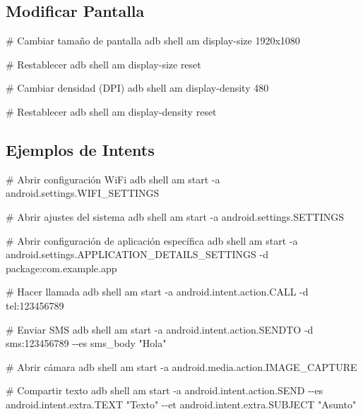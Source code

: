\documentclass[
  doc,
  floatsintext,
  longtable,
  a4paper,
  nolmodern,
  notxfonts,
  notimes,
  12pt,
  colorlinks=true,linkcolor=blue,citecolor=blue,urlcolor=blue]{apa7}
\newenvironment{Shaded}{\begin{snugshade}}{\end{snugshade}}
\newcommand{\AttributeTok}[1]{\textcolor[rgb]{0.40,0.45,0.13}{#1}}
\newcommand{\CommentTok}[1]{\textcolor[rgb]{0.37,0.37,0.37}{#1}}
\newcommand{\ExtensionTok}[1]{\textcolor[rgb]{0.00,0.23,0.31}{#1}}
\newcommand{\NormalTok}[1]{\textcolor[rgb]{0.00,0.23,0.31}{#1}}
\newcommand{\StringTok}[1]{\textcolor[rgb]{0.13,0.47,0.30}{#1}}
\begin{document}
\subsection{Modificar Pantalla}\label{modificar-pantalla}

\begin{Shaded}
\begin{Highlighting}[]
\CommentTok{\# Cambiar tamaño de pantalla}
\ExtensionTok{adb}\NormalTok{ shell am display{-}size 1920x1080}

\CommentTok{\# Restablecer}
\ExtensionTok{adb}\NormalTok{ shell am display{-}size reset}

\CommentTok{\# Cambiar densidad (DPI)}
\ExtensionTok{adb}\NormalTok{ shell am display{-}density 480}

\CommentTok{\# Restablecer}
\ExtensionTok{adb}\NormalTok{ shell am display{-}density reset}
\end{Highlighting}
\end{Shaded}

\subsection{Ejemplos de Intents}\label{ejemplos-de-intents}

\begin{Shaded}
\begin{Highlighting}[]
\CommentTok{\# Abrir configuración WiFi}
\ExtensionTok{adb}\NormalTok{ shell am start }\AttributeTok{{-}a}\NormalTok{ android.settings.WIFI\_SETTINGS}

\CommentTok{\# Abrir ajustes del sistema}
\ExtensionTok{adb}\NormalTok{ shell am start }\AttributeTok{{-}a}\NormalTok{ android.settings.SETTINGS}

\CommentTok{\# Abrir configuración de aplicación específica}
\ExtensionTok{adb}\NormalTok{ shell am start }\AttributeTok{{-}a}\NormalTok{ android.settings.APPLICATION\_DETAILS\_SETTINGS }\AttributeTok{{-}d}\NormalTok{ package:com.example.app}

\CommentTok{\# Hacer llamada}
\ExtensionTok{adb}\NormalTok{ shell am start }\AttributeTok{{-}a}\NormalTok{ android.intent.action.CALL }\AttributeTok{{-}d}\NormalTok{ tel:123456789}

\CommentTok{\# Enviar SMS}
\ExtensionTok{adb}\NormalTok{ shell am start }\AttributeTok{{-}a}\NormalTok{ android.intent.action.SENDTO }\AttributeTok{{-}d}\NormalTok{ sms:123456789 }\AttributeTok{{-}{-}es}\NormalTok{ sms\_body }\StringTok{"Hola"}

\CommentTok{\# Abrir cámara}
\ExtensionTok{adb}\NormalTok{ shell am start }\AttributeTok{{-}a}\NormalTok{ android.media.action.IMAGE\_CAPTURE}

\CommentTok{\# Compartir texto}
\ExtensionTok{adb}\NormalTok{ shell am start }\AttributeTok{{-}a}\NormalTok{ android.intent.action.SEND }\AttributeTok{{-}{-}es}\NormalTok{ android.intent.extra.TEXT }\StringTok{"Texto"} \AttributeTok{{-}{-}et}\NormalTok{ android.intent.extra.SUBJECT }\StringTok{"Asunto"}
\end{Highlighting}
\end{Shaded}
\end{document}
